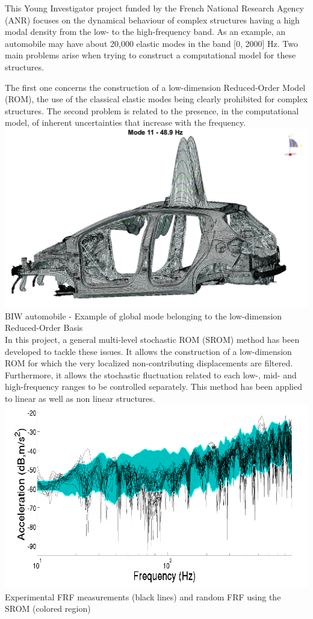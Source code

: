\documentclass[11pt]{article}%
\begin{document}
\begin{minipage}[!t]{.75\linewidth}





\begin{multicols}{2} %
This Young Investigator project funded by the French National Research Agency (ANR) focuses on the dynamical behaviour of complex structures having a high modal density from the low- to the high-frequency band. As an example, an automobile may have about 20,000 elastic modes in the band [0, 2000] Hz. Two main problems arise when trying to construct a computational model for these structures. 

The first one concerns the construction of a low-dimension Reduced-Order Model (ROM), the use of the classical elastic modes being clearly prohibited for complex structures. The second problem is related to the presence, in the computational model, of inherent uncertainties that increase with the frequency. 
\includegraphics[width=0.5 \textwidth]{anas/fig1.png}
{\scriptsize BIW automobile - Example of global mode belonging to the low-dimension Reduced-Order Basis}\\
In this project, a general  multi-level stochastic ROM (SROM) method has been developed to tackle these issues. It allows the construction of a low-dimension ROM for which the very localized non-contributing displacements are filtered. Furthermore, it allows the stochastic fluctuation related to each low-,  mid- and high-frequency ranges to be controlled separately. This method has been applied to linear as well as non linear structures.
\includegraphics[width=0.5 \textwidth]{anas/fig2.png}
{\scriptsize Experimental FRF measurements (black lines) and random FRF using the SROM (colored region)}\\


\end{multicols}
\end{minipage}
\end{document}
